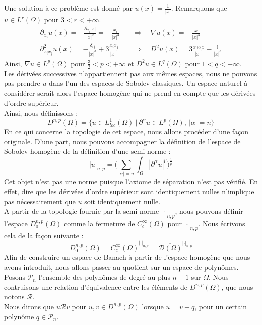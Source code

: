Une solution à ce problème est donné par $\displaystyle u(x) = \frac{1}{|x|} $.
Remarquons que $u \in L^{r}(\Omega)$ pour $ 3 < r < +\infty$.
\begin{align*}
    \partial_{x_i}u(x) = -\frac{\partial_{x_i} |x|}{|x|^2} = -\frac{x_i}{|x|^3} \quad &\Rightarrow \quad \nabla u(x) = - \frac{x}{|x|^3} \\
    \partial_{x_i x_j}^2u(x) = -\frac{\delta_{ij}}{|x|^3} + 3\frac{x_i x_j}{|x|^5} &\Rightarrow \quad D^2u(x) = 3 \frac{x \otimes x}{|x|^5} - \frac{\mathbb{I}}{|x|^3}
\end{align*}
Ainsi, $\nabla u \in L^p(\Omega)$ pour $ \frac{3}{2}< p < +\infty$ et $D^2u \in L^q(\Omega)$ pour $1 < q < +\infty$.\\
Les dérivées successives n'appartiennent pas aux mêmes espaces, nous ne pouvons pas prendre $u$ dans l'un des espaces de Sobolev classiques.
Un espace naturel à considérer serait alors l'espace homogène qui ne prend en compte que les dérivées d'ordre supérieur.\\
Ainsi, nous définissons :
$$ D^{n,p}(\Omega) = \big\{ u \in L_{loc}^1(\Omega) \ \big| \ \partial^{\alpha}u \in L^p(\Omega),\ |\alpha| = n \big\} $$
En ce qui concerne la topologie de cet espace, nous allons procéder d'une façon originale. D'une part, nous pouvons accompagner la définition de l'espace de Sobolev homogène de la définition
d'une semi-norme :
$$ |u|_{n,p} = \Bigg( \sum_{|\alpha| = n} \int_{\Omega} |\partial^{\alpha} u|^p \Bigg)^\frac{1}{p} $$
Cet objet n'est pas une norme puisque l'axiome de séparation n'est pas vérifié. En effet, dire que les dérivées d'ordre supérieur sont identiquement nulles
n'implique pas nécessairement que $u$ soit identiquement nulle. \\
A partir de la topologie fournie par la semi-norme $|\cdot|_{n,p}$, nous pouvons définir l'espace $D^{n,p}_0(\Omega)$ comme la fermeture de $C^{\infty}_c(\Omega)$ pour $|\cdot|_{n,p}$. Nous écrivons cela de la façon suivante :
$$ D_0^{n,p}(\Omega) = \overline{C^{\infty}_c(\Omega)}^{|\cdot|_{n,p}} = \overline{\mathcal{D}(\Omega)}^{|\cdot|_{n,p}} $$
Afin de construire un espace de Banach à partir de l'espace homogène que nous avons introduit, nous allons passer au quotient sur un espace de polynômes. \\
Posons $\mathscr{P}_n$ l'ensemble des polynômes de degré au plus $n-1$ sur $\Omega$. Nous contruisons une relation d'équivalence entre les éléments de $D^{n,p}(\Omega)$, que nous notons $\mathcal{R}$.\\
Nous dirons que $u \mathcal{R} v$ pour $u,v \in D^{n,p}(\Omega)$ lorsque $u = v + q$, pour un certain polynôme $q \in \mathscr{P}_n$.
